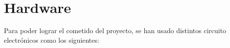 \chapter{Hardware}
\label{hardware}
Para poder lograr el cometido del proyecto, se han usado distintos circuito electrónicos como los siguientes:
